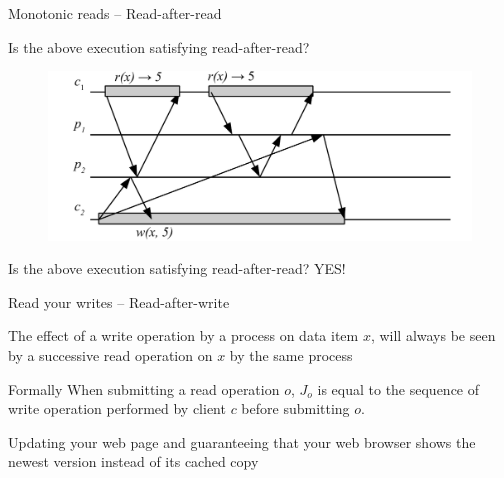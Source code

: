 \begin{frame}{Monotonic reads -- Read-after-read}
\begin{overprint}
\begin{figure}
\end{figure}
\BI
\item Is the above execution satisfying read-after-read?
\EI
{}
\begin{figure}
	\includegraphics[width=\textwidth]{figs/09/read-after-read-02n}
\end{figure}
\BI
\item Is the above execution satisfying read-after-read? \quad YES!
\EI

\end{overprint}
\end{frame}


\begin{frame}{Read your writes -- Read-after-write}

\begin{definition}
The effect of a write operation by a process on data item $x$, will always 
be seen by a successive read operation on $x$ by the same process
\vspace{-12pt}
\begin{center}
\begin{minipage}{0.95\textwidth}
\begin{block}{Formally}
When submitting a read operation $o$,
$J_o$ is equal to  the sequence of write operation performed by client $c$ before
submitting $o$.
\end{block}
\end{minipage}
\end{center}
\end{definition}

\begin{example}
Updating your web page and guaranteeing that your web browser shows the
newest version instead of its cached copy
\end{example}

\end{frame}

